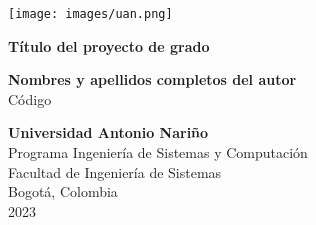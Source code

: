 \begin{titlepage}
    \begin{center}
        \texttt{[image: images/uan.png]}\\
        \vspace*{1cm}

        \Huge
        \textbf{Título del proyecto de grado}
 
        \vspace{2cm}
        
        \large
        \textbf{Nombres y apellidos completos del autor}\\
        Código
 
        \vfill
             
        \vspace{0.8cm}
             
        \textbf{Universidad Antonio Nariño}\\
        Programa Ingeniería de Sistemas y Computación\\
        Facultad de Ingeniería de Sistemas\\
        Bogotá, Colombia\\
        2023
    \end{center}
\end{titlepage}
